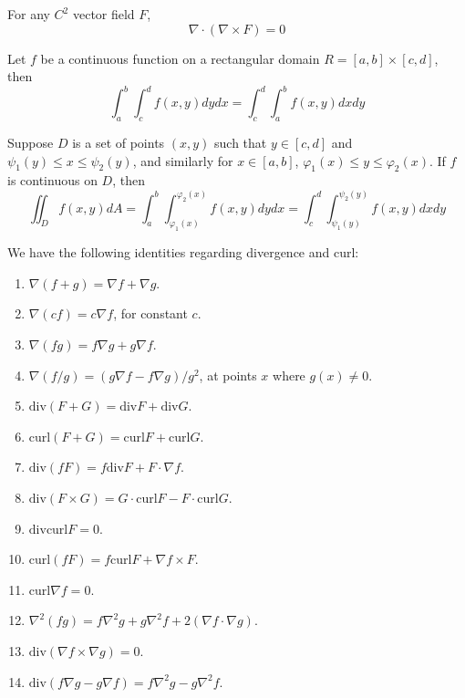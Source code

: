 \documentclass[openany]{book}
\newcommand{\curl}{\text{curl}}
\newcommand{\diverg}{\text{div}}
\begin{document}
\begin{prop}
    For any $C^2$ vector field $F$, 
    \begin{equation*}
        \nabla\cdot(\nabla\times F)=0
    \end{equation*}
\end{prop}



\begin{prop}
    Let $f$ be a continuous function on a rectangular domain $R=[a,b]\times[c,d]$, then 
    \begin{equation*}
        \int_a^b\int_c^df(x,y)dydx=\int_c^d\int_a^bf(x,y)dxdy
    \end{equation*}
\end{prop}

\begin{prop}
    Suppose $D$ is a set of points $(x,y)$ such that $y\in [c,d]$ and $\psi_1(y)\leq x\leq\psi_2(y)$, and similarly for $x\in [a,b]$, $\varphi_1(x)\leq y\leq\varphi_2(x)$. If $f$ is continuous on $D$, then 
    \begin{equation*}
        \iint_Df(x,y)dA=\int_a^b\int_{\varphi_1(x)}^{\varphi_2(x)}f(x,y)dydx=\int_c^d\int_{\psi_1(y)}^{\psi_2(y)}f(x,y)dxdy
    \end{equation*}
\end{prop}


\begin{prop}
    We have the following identities regarding divergence and curl: 
    \begin{enumerate}
        \item $\nabla(f+g)=\nabla f+\nabla g$.
        \item $\nabla (cf)=c\nabla f$, for constant $c$.
        \item $\nabla (fg)=f\nabla g+g\nabla f$.
        \item $\nabla (f/g)=(g\nabla f-f\nabla g)/g^2$, at points $x$ where $g(x)\neq 0$.
        \item $\diverg (F+G)=\diverg F+\diverg G$.
        \item $\curl(F+G)=\curl F+\curl G$.
        \item $\diverg(fF)=f\diverg F+F\cdot\nabla f$.
        \item $\diverg (F\times G)=G\cdot\curl F-F\cdot\curl G$.
        \item $\diverg\curl F=0$.
        \item $\curl(fF)=f\curl F+\nabla f\times F$.
        \item $\curl\nabla f=0$.
        \item $\nabla^2(fg)=f\nabla^2g+g\nabla^2f+2(\nabla f\cdot \nabla g)$.
        \item $\diverg(\nabla f\times\nabla g)=0$.
        \item $\diverg(f\nabla g-g\nabla f)=f\nabla^2g-g\nabla^2f$.
    \end{enumerate}
\end{prop}
\end{document}
